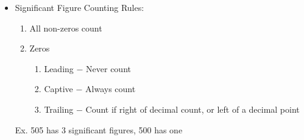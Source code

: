 \documentclass[12pt]{article}
\begin{document}
\begin{itemize}
  \item Significant Figure Counting Rules:

    \begin{enumerate}

      \item All non-zeros count

      \item Zeros

        \begin{enumerate}

          \item Leading $-$ Never count

          \item Captive $-$ Always count

          \item Trailing $-$ Count if right of decimal count, or left of a decimal point

        \end{enumerate}

    \end{enumerate}

    \begin{center} Ex. 505 has 3 significant figures, 500 has one \end{center}

\end{itemize}
\end{document}
